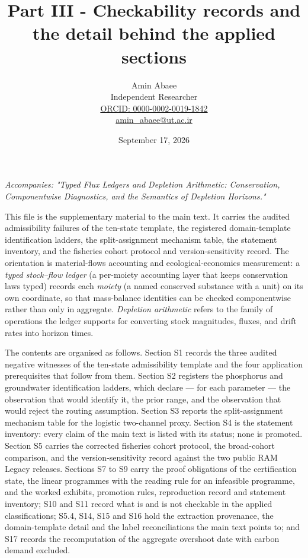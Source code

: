 \documentclass[11pt]{article}
\begin{document}
\title{Part III - Checkability records and the detail behind the applied sections}
\author{Amin Abaee\\[0.35em]
{\small Independent Researcher}\\[0.55em]
{\small\href{https://orcid.org/\allowbreak{}0000-0002-0019-1842}{ORCID: 0000-0002-0019-1842}}\\[0.3em]
{\small\href{mailto:amin\_abaee@ut.ac.ir}{amin\_abaee@ut.ac.ir}}}
\date{September 17, 2026}
\maketitle

\emph{Accompanies: "Typed Flux Ledgers and Depletion Arithmetic: Conservation, Componentwise Diagnostics, and the Semantics of Depletion Horizons."}

This file is the supplementary material to the main text. It carries the audited admissibility failures of the ten-state template, the registered domain-template identification ladders, the split-assignment mechanism table, the statement inventory, and the fisheries cohort protocol and version-sensitivity record. The orientation is material-flows accounting and ecological-economics measurement: a \emph{typed stock--flow ledger} (a per-moiety accounting layer that keeps conservation laws typed) records each \emph{moiety} (a named conserved substance with a unit) on its own coordinate, so that mass-balance identities can be checked componentwise rather than only in aggregate. \emph{Depletion arithmetic} refers to the family of operations the ledger supports for converting stock magnitudes, fluxes, and drift rates into horizon times.

The contents are organised as follows. Section S1 records the three audited negative witnesses of the ten-state admissibility template and the four application prerequisites that follow from them. Section S2 registers the phosphorus and groundwater identification ladders, which declare --- for each parameter --- the observation that would identify it, the prior range, and the observation that would reject the routing assumption. Section S3 reports the split-assignment mechanism table for the logistic two-channel proxy. Section S4 is the statement inventory: every claim of the main text is listed with its status; none is promoted. Section S5 carries the corrected fisheries cohort protocol, the broad-cohort comparison, and the version-sensitivity record against the two public RAM Legacy releases. Sections S7 to S9 carry the proof obligations of the certification state, the linear programmes with the reading rule for an infeasible programme, and the worked exhibits, promotion rules, reproduction record and statement inventory; S10 and S11 record what is and is not checkable in the applied classifications; S5.4, S14, S15 and S16 hold the extraction provenance, the domain-template detail and the label reconciliations the main text points to; and S17 records the recomputation of the aggregate overshoot date with carbon demand excluded.
\end{document}
